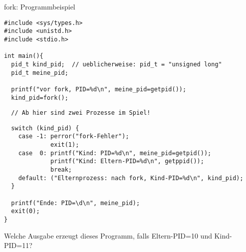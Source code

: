 \documentclass[utf8,9pt]{beamer}
\newenvironment{blue}{\color{blue}}{}
\begin{document}
\begin{frame}[fragile]{fork: Programmbeispiel}{}

\footnotesize
  \vspace*{-1em}
\begin{verbatim}
#include <sys/types.h>
#include <unistd.h>
#include <stdio.h>

int main(){
  pid_t kind_pid;  // ueblicherweise: pid_t = "unsigned long"
  pid_t meine_pid;

  printf("vor fork, PID=%d\n", meine_pid=getpid());
  kind_pid=fork();
\end{verbatim}

  \vspace*{-12pt}
  \begin{blue}
    \footnotesize
    \begin{verbatim}  
  // Ab hier sind zwei Prozesse im Spiel!
    \end{verbatim}
  \end{blue}

  \vspace*{-22pt}
    \footnotesize
\begin{verbatim}
  switch (kind_pid) {
    case -1: perror("fork-Fehler");
             exit(1);
    case  0: printf("Kind: PID=%d\n", meine_pid=getpid());
             printf("Kind: Eltern-PID=%d\n", getppid());
             break;
    default: ("Elternprozess: nach fork, Kind-PID=%d\n", kind_pid);
  }

  printf("Ende: PID=\d\n", meine_pid);
  exit(0);
}
\end{verbatim}

\begin{blue}
  \small Welche Ausgabe erzeugt dieses Programm, falls Eltern-PID=10
  und Kind-PID=11?
\end{blue}

\end{frame}
\end{document}
